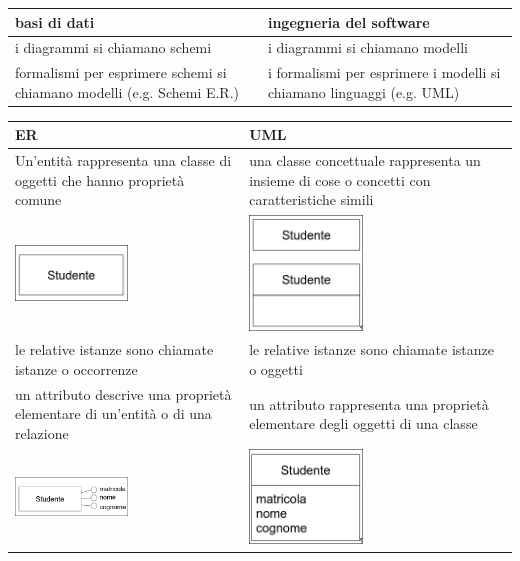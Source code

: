\documentclass{article}
\begin{document}
\begin{center}
    \begin{tabular}{p{}|p{}}
        basi di dati & ingegneria del software\\
        \hline
        i diagrammi si chiamano schemi & i diagrammi si chiamano modelli\\
        formalismi per esprimere schemi si chiamano modelli (e.g. Schemi E.R.) & i formalismi per esprimere i modelli si chiamano linguaggi (e.g. UML)
    \end{tabular}
    \begin{tabular}{p{}|p{}}
        ER & UML\\
        \hline
        Un'entità rappresenta una classe di oggetti che hanno proprietà comune & una classe concettuale
        rappresenta un insieme di
        cose o concetti con
        caratteristiche simili\\
        \includegraphics[width=3cm]{images/er.png} & \includegraphics[width=3cm]{images/uml.png}\\
        le relative istanze sono chiamate istanze o occorrenze & le relative istanze sono chiamate istanze o oggetti\\
        un attributo descrive una proprietà elementare di un'entità o di una relazione & un attributo rappresenta una proprietà elementare degli oggetti di una classe\\
        \includegraphics[width=3cm]{images/er2.png} & \includegraphics[width=3cm]{images/uml2.png}\\

\end{tabular}
\end{center}
\end{document}
